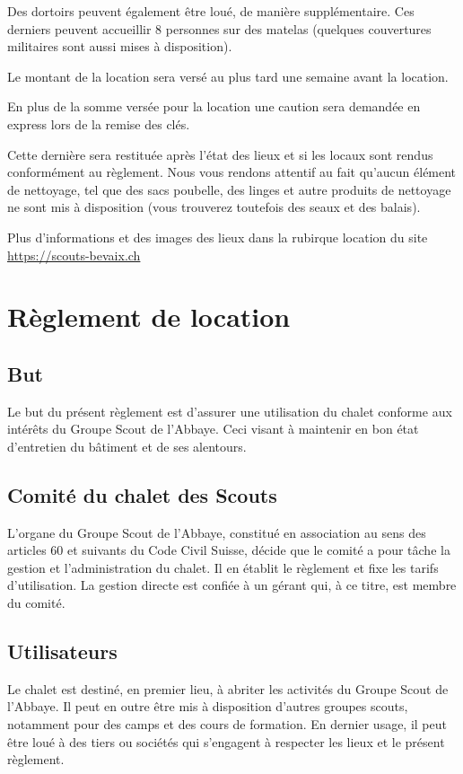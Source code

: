 \documentclass[a4paper,12pt]{extarticle}
\begin{document}
Des dortoirs peuvent également être loué, de manière supplémentaire.
Ces derniers peuvent accueillir 8 personnes sur des matelas (quelques couvertures militaires sont aussi mises à disposition).

Le montant de la location sera versé au plus tard une semaine avant la location.

En plus de la somme versée pour la location une caution sera demandée en express lors de la remise des clés.

Cette dernière sera restituée après l'état des lieux et si les locaux sont rendus conformément au règlement.
Nous vous rendons attentif au fait qu'aucun élément de nettoyage, tel que des sacs poubelle, des linges et autre produits de nettoyage ne sont mis à disposition (vous trouverez toutefois des seaux et des balais).

Plus d'informations et des images des lieux dans la rubirque location du site \url{https://scouts-bevaix.ch}

\newpage

\section{Règlement de location \label{sec:contract}}

\subsection{But}
Le but du présent règlement est d'assurer une utilisation du chalet conforme aux intérêts du Groupe Scout de l'Abbaye.
Ceci visant à maintenir en bon état d'entretien du bâtiment et de ses alentours.

\subsection{Comité du chalet des Scouts}

L'organe du Groupe Scout de l'Abbaye, constitué en association au sens des articles 60 et suivants du Code Civil Suisse, décide que le comité a pour tâche la gestion et l'administration du chalet. Il en établit le règlement et fixe les tarifs d'utilisation.
La gestion directe est confiée à un gérant qui, à ce titre, est membre du comité.

\subsection{Utilisateurs}
Le chalet est destiné, en premier lieu, à abriter les activités du Groupe Scout de l'Abbaye.
Il peut en outre être mis à disposition d'autres groupes scouts, notamment pour des camps et des cours de formation. En dernier usage, il peut être loué à des tiers ou sociétés qui s'engagent à respecter les lieux et le présent règlement.
\end{document}
